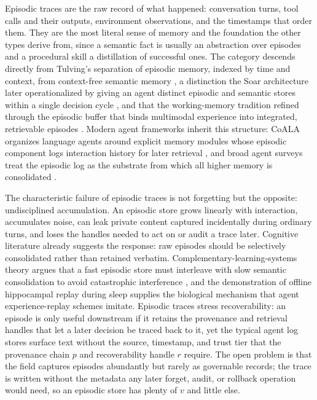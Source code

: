 Episodic traces are the raw record of what happened: conversation turns, tool calls and their outputs, environment observations, and the timestamps that order them. They are the most literal sense of memory and the foundation the other types derive from, since a semantic fact is usually an abstraction over episodes and a procedural skill a distillation of successful ones. The category descends directly from Tulving's separation of episodic memory, indexed by time and context, from context-free semantic memory \citep{tulving1972episodic}, a distinction the Soar architecture later operationalized by giving an agent distinct episodic and semantic stores within a single decision cycle \citep{laird2012soar}, and that the working-memory tradition refined through the episodic buffer that binds multimodal experience into integrated, retrievable episodes \citep{baddeley2000episodic}. Modern agent frameworks inherit this structure: CoALA organizes language agents around explicit memory modules whose episodic component logs interaction history for later retrieval \citep{sumers2024cognitivearchitectureslanguageagents}, and broad agent surveys treat the episodic log as the substrate from which all higher memory is consolidated \citep{xi2023riseandpotential}.

The characteristic failure of episodic traces is not forgetting but the opposite: undisciplined accumulation. An episodic store grows linearly with interaction, accumulates noise, can leak private content captured incidentally during ordinary turns, and loses the handles needed to act on or audit a trace later. Cognitive literature already suggests the response: raw episodes should be selectively consolidated rather than retained verbatim. Complementary-learning-systems theory argues that a fast episodic store must interleave with slow semantic consolidation to avoid catastrophic interference \citep{mcclelland1995complementary,kumaran2016complementary}, and the demonstration of offline hippocampal replay during sleep \citep{wilson1994reactivation} supplies the biological mechanism that agent experience-replay schemes imitate. Episodic traces stress recoverability: an episode is only useful downstream if it retains the provenance and retrieval handles that let a later decision be traced back to it, yet the typical agent log stores surface text without the source, timestamp, and trust tier that the provenance chain $p$ and recoverability handle $r$ require. The open problem is that the field captures episodes abundantly but rarely as governable records; the trace is written without the metadata any later forget, audit, or rollback operation would need, so an episodic store has plenty of $v$ and little else.

